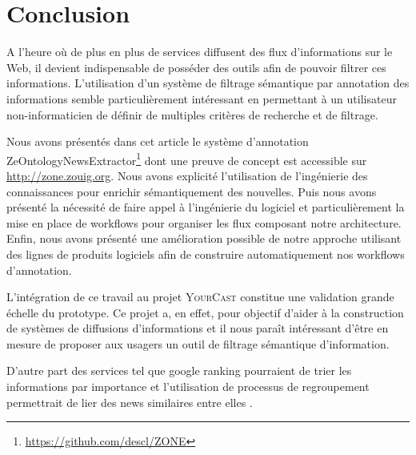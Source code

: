 \documentclass[]{ciel}
\newcommand{\Y}[0]{\textsc{YourCast}\xspace}
\begin{document}
\section{Conclusion}
\label{sect:conclusion}
A l'heure où de plus en plus de services diffusent des flux d'informations sur le Web, il devient indispensable de posséder des outils afin de pouvoir filtrer ces informations. L'utilisation d'un système de filtrage sémantique par annotation des informations semble particulièrement intéressant en permettant à un utilisateur non-informaticien de définir de multiples critères de recherche et de filtrage.

Nous avons présentés dans cet article le système d'annotation ZeOntologyNewsExtractor\footnote{\url{https://github.com/descl/ZONE}} dont une preuve de concept est accessible sur \url{http://zone.zouig.org}. Nous avons explicité l'utilisation de l'ingénierie des connaissances pour enrichir sémantiquement des nouvelles. Puis nous avons présenté la nécessité de faire appel à l'ingénierie du logiciel et particulièrement la mise en place de workflows pour organiser les flux composant notre architecture. Enfin, nous avons présenté une amélioration possible de notre approche utilisant des lignes de produits logiciels afin de construire automatiquement nos workflows d'annotation.

L'intégration de ce travail au projet \Y constitue une validation  grande échelle du prototype. Ce projet a, en effet, pour objectif d'aider à la construction de systèmes de diffusions d'informations et il nous paraît intéressant d'être en mesure de proposer aux usagers un outil de filtrage sémantique d'information.

D'autre part des services tel que google ranking pourraient de trier les informations par importance et l'utilisation de processus de regroupement permettrait de lier des news similaires entre elles \cite{Taddesse2010}.

%

\label{sect:bib}



\appendix


\end{document}
